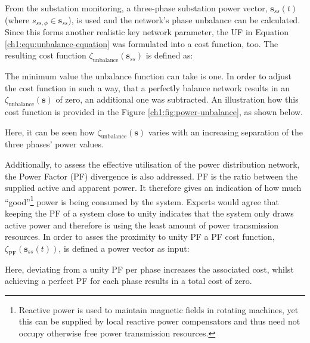 
From the substation monitoring, a three-phase substation power vector, $\textbf{s}_{ss}(t)$ (where $s_{ss,\phi} \in \textbf{s}_{ss}$), is used and the network's phase unbalance can be calculated.
Since this forms another realistic key network parameter, the UF in Equation \ref{ch1:equ:unbalance-equation} was formulated into a cost function, too.
The resulting cost function $\zeta_\text{unbalance}(\textbf{s}_{ss})$ is defined as:



The minimum value the unbalance function can take is one.
In order to adjust the cost function in such a way, that a perfectly balance network results in an $\zeta_\text{unbalance}(\textbf{s})$ of zero, an additional one was subtracted.
An illustration how this cost function is provided in the Figure \ref{ch1:fig:power-unbalance}, as shown below.



Here, it can be seen how $\zeta_\text{unbalance}(\textbf{s})$ varies with an increasing separation of the three phases' power values.


Additionally, to assess the effective utilisation of the power distribution network, the Power Factor (PF) divergence is also addressed.
PF is the ratio between the supplied active and apparent power.
It therefore gives an indication of how much ``good''\footnote[1]{Reactive power is used to maintain magnetic fields in rotating machines, yet this can be supplied by local reactive power compensators and thus need not occupy otherwise free power transmission resources.} power is being consumed by the system.
Experts would agree that keeping the PF of a system close to unity indicates that the system only draws active power and therefore is using the least amount of power transmission resources.
In order to asses the proximity to unity PF a PF cost function, $\zeta_\text{PF}(\textbf{s}_{ss}(t))$, is defined a power vector as input:



Here, deviating from a unity PF per phase increases the associated cost, whilst achieving a perfect PF for each phase results in a total cost of zero.


